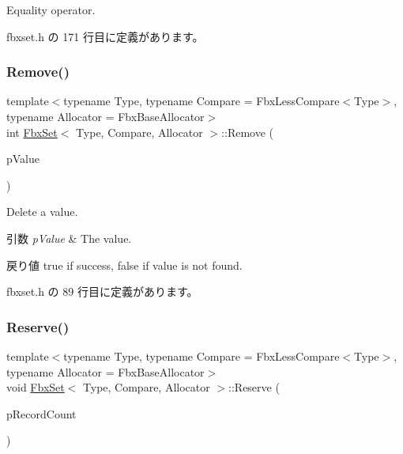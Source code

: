Equality operator. 



 fbxset.\+h の 171 行目に定義があります。

\mbox{\label{class_fbx_set_a12e704b8d6f84a349c27cd40ef4dde11}} 
\subsubsection{\texorpdfstring{Remove()}{Remove()}}
{\footnotesize\ttfamily template$<$typename Type, typename Compare = Fbx\+Less\+Compare$<$\+Type$>$, typename Allocator = Fbx\+Base\+Allocator$>$ \\
int \hyperlink{class_fbx_set}{Fbx\+Set}$<$ Type, Compare, Allocator $>$\+::Remove (\begin{DoxyParamCaption}\item[{const \hyperlink{class_fbx_set_abb0f1b628634e07825532526e2e92baf}{Value\+Type} \&}]{p\+Value }\end{DoxyParamCaption})\hspace{0.3cm}{\ttfamily [inline]}}

Delete a value. 
\begin{DoxyParams}{引数}
{\em p\+Value} & The value. \\
\hline
\end{DoxyParams}
\begin{DoxyReturn}{戻り値}
{\ttfamily true} if success, {\ttfamily false} if value is not found. 
\end{DoxyReturn}


 fbxset.\+h の 89 行目に定義があります。

\mbox{\label{class_fbx_set_ac7d73b7db8fe03350e2ced16ffff1c36}} 
\subsubsection{\texorpdfstring{Reserve()}{Reserve()}}
{\footnotesize\ttfamily template$<$typename Type, typename Compare = Fbx\+Less\+Compare$<$\+Type$>$, typename Allocator = Fbx\+Base\+Allocator$>$ \\
void \hyperlink{class_fbx_set}{Fbx\+Set}$<$ Type, Compare, Allocator $>$\+::Reserve (\begin{DoxyParamCaption}\item[{unsigned int}]{p\+Record\+Count }\end{DoxyParamCaption})\hspace{0.3cm}{\ttfamily [inline]}}

